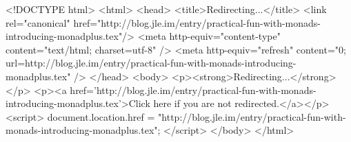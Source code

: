 <!DOCTYPE html>
<html>
<head>
<title>Redirecting...</title>
<link rel="canonical" href="http://blog.jle.im/entry/practical-fun-with-monads-introducing-monadplus.tex"/>
<meta http-equiv="content-type" content="text/html; charset=utf-8" />
<meta http-equiv="refresh" content="0; url=http://blog.jle.im/entry/practical-fun-with-monads-introducing-monadplus.tex" />
</head>
<body>
  <p><strong>Redirecting...</strong></p>
  <p><a href='http://blog.jle.im/entry/practical-fun-with-monads-introducing-monadplus.tex'>Click here if you are not redirected.</a></p>
  <script>
    document.location.href = "http://blog.jle.im/entry/practical-fun-with-monads-introducing-monadplus.tex";
  </script>
</body>
</html>

